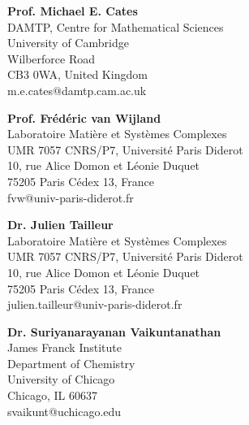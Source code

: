 \documentclass[11pt,a4paper,sans]{moderncv}
\begin{document}
\begin{multicols}{2}

\textbf{Prof. Michael E. Cates}\\
DAMTP, Centre for Mathematical Sciences\\
University of Cambridge\\
Wilberforce Road\\
CB3 0WA, United Kingdom\\
m.e.cates@damtp.cam.ac.uk

\columnbreak 

\textbf{Prof. Frédéric van Wijland}\\
Laboratoire Matière et Systèmes Complexes\\
UMR 7057 CNRS/P7, Universit\'e Paris Diderot\\
10, rue Alice Domon et Léonie Duquet\\
75205 Paris Cédex 13, France\\
fvw@univ-paris-diderot.fr

\end{multicols}


\begin{multicols}{2}

\textbf{Dr. Julien Tailleur}\\
Laboratoire Matière et Systèmes Complexes\\
UMR 7057 CNRS/P7, Universit\'e Paris Diderot\\
10, rue Alice Domon et Léonie Duquet\\
75205 Paris Cédex 13, France\\
julien.tailleur@univ-paris-diderot.fr

\columnbreak

\textbf{Dr. Suriyanarayanan Vaikuntanathan}\\
James Franck Institute\\
Department of Chemistry\\
University of Chicago\\
Chicago, IL 60637\\
svaikunt@uchicago.edu

\end{multicols}
\end{document}

